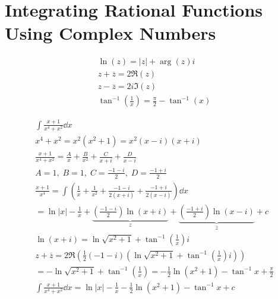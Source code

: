 \documentclass[00_complete]{subfiles}
\begin{document}
\section{Integrating Rational Functions Using Complex Numbers}
\setcounter{example}{0}
\begin{reminder}
    $$
    \begin{gathered}
        \ln(z) = |z| + \arg(z)i \\
        z + \overline z = 2\Re(z) \\
        z - \overline z = 2i\Im(z) \\
        \tan^{-1}\left(\frac{1}{x}\right) = \frac{\pi}{2}-\tan^{-1}(x)
    \end{gathered}
    $$
\end{reminder}
\begin{example}
    $$
    \begin{gathered}
        \int \frac{x+1}{x^4+x^2}\dd{x} \\
        x^4+x^2 = x^2(x^2+1) = x^2(x-i)(x+i) \\
        \frac{x+1}{x^4+x^2}=\frac{A}{x}+\frac{B}{x^2}+\frac{C}{x+i}+\frac{D}{x-i}
        \\
        A=1,\; B=1,\; C=\frac{-1-i}{2},\; D=\frac{-1+i}{2} \\
        \frac{x+1}{x^4} = \int \left( \frac{1}{x} + \frac{1}{x^2} +
            \frac{-1-i}{2(x+i)}+\frac{-1+i}{2(x-i)} \right) \dd{x} \\
            =\ln|x| - \frac{1}{x} +
            \underbrace{\left(\frac{-1-i}{2}\right)\ln(x+i)}_{z}
            +\underbrace{\left(\frac{-1+i}{2}\right)\ln(x-i)}_{\overline z}+c
            \\
            \ln(x+i) = \ln \sqrt{x^2+1}+\tan^{-1}\left(\frac{1}{x}\right)i \\
            z+\overline z=2\Re\left(\frac{1}{2}(-1-i)\left(\ln
                \sqrt{x^2+1}+\tan^{-1}\left(\frac{1}{x}\right)i\right)\right)
                \\
            = -\ln \sqrt{x^2+1}+ \tan^{-1}\left(\frac{1}{x}\right)
            =-\frac{1}{2}\ln(x^2+1)-\tan^{-1}x+\frac{\pi}{2} \\
            \int \frac{x+1}{x^4+x^2}\dd{x} = \ln|x|-\frac{1}{x} -
            \frac{1}{2}\ln(x^2+1)-\tan^{-1}x+c
    \end{gathered}
    $$
\end{example}
\end{document}
